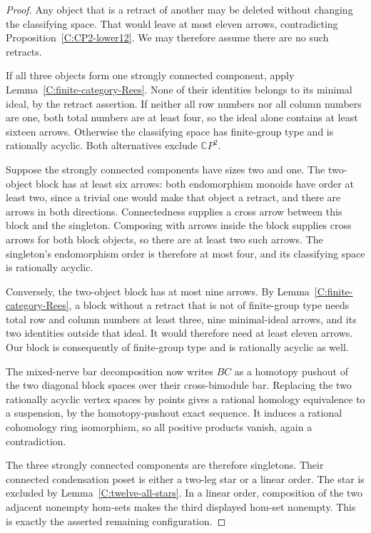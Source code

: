 \begin{proof}
Any object that is a retract of another may be deleted without
changing the classifying space. That would leave at most eleven
arrows, contradicting Proposition~\ref{C:CP2-lower12}.
We may therefore assume there are no such retracts.

If all three objects form one strongly connected component,
apply Lemma~\ref{C:finite-category-Rees}. None of their
identities belongs to its minimal ideal, by the retract
assertion. If neither all row numbers nor all column numbers
are one, both total numbers are at least four, so the ideal
alone contains at least sixteen arrows. Otherwise the
classifying space has finite-group type and is rationally
acyclic. Both alternatives exclude $\mathbb CP^2$.

Suppose the strongly connected components have sizes two
and one. The two-object block has at least six arrows:
both endomorphism monoids have order at least two, since a
trivial one would make that object a retract, and there are
arrows in both directions. Connectedness supplies a cross
arrow between this block and the singleton. Composing with
arrows inside the block supplies cross arrows for both block
objects, so there are at least two such arrows.
The singleton's endomorphism order is therefore at most four,
and its classifying space is rationally acyclic.

Conversely, the two-object block has at most nine arrows.
By Lemma~\ref{C:finite-category-Rees}, a block without a
retract that is not of finite-group type needs total row and
column numbers at least three, nine minimal-ideal arrows,
and its two identities outside that ideal. It would therefore
need at least eleven arrows. Our block is consequently of
finite-group type and is rationally acyclic as well.

The mixed-nerve bar decomposition now writes $BC$ as a
homotopy pushout of the two diagonal block spaces over their
cross-bimodule bar. Replacing the two rationally acyclic
vertex spaces by points gives a rational homology equivalence
to a suspension, by the homotopy-pushout exact sequence.
It induces a rational cohomology ring isomorphism, so all
positive products vanish, again a contradiction.

The three strongly connected components are therefore
singletons. Their connected condensation poset is either a
two-leg star or a linear order. The star is excluded by
Lemma~\ref{C:twelve-all-stars}. In a linear order, composition
of the two adjacent nonempty hom-sets makes the third
displayed hom-set nonempty. This is exactly the asserted
remaining configuration.
\end{proof}
